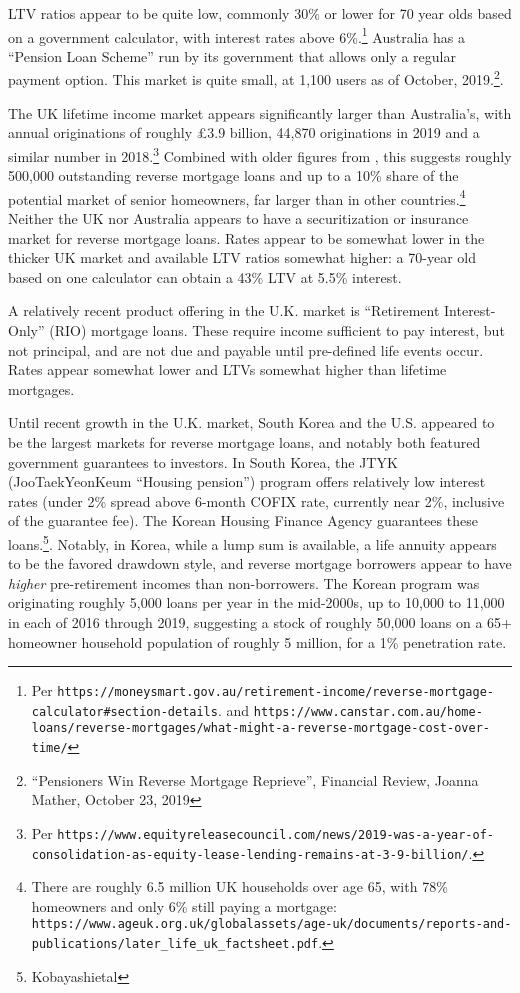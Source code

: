 \documentclass[12pt]{article}
\begin{document}
LTV ratios appear to be quite low, commonly 30\% or lower for 70 year olds
based on a government calculator, with interest rates above 6\%.\footnote{Per
\texttt{https://moneysmart.gov.au/retirement-income/reverse-mortgage-calculator\#section-details}.
and
\texttt{https://www.canstar.com.au/home-loans/reverse-mortgages/what-might-a-reverse-mortgage-cost-over-time/}}
Australia has a ``Pension Loan Scheme'' run by its government that allows only
a regular payment option. This market is quite small, at 1,100 users as of
October, 2019.\footnote{``Pensioners Win Reverse Mortgage Reprieve'', Financial
Review, Joanna Mather, October 23, 2019}.

The UK lifetime income market appears significantly larger than Australia's,
with annual originations of roughly \pounds 3.9 billion, 44,870 originations in
2019 and a similar number in 2018.\footnote{Per
\texttt{https://www.equityreleasecouncil.com/news/2019-was-a-year-of-consolidation-as-equity-lease-lending-remains-at-3-9-billion/}.}
Combined with older figures from \textcite{Kobayashietal}, this suggests
roughly 500,000 outstanding reverse mortgage loans and up to a 10\% share of
the potential market of senior homeowners, far larger than in other
countries.\footnote{There are roughly 6.5 million UK households over age 65,
with 78\% homeowners and only 6\% still paying a mortgage:
\texttt{https://www.ageuk.org.uk/globalassets/age-uk/documents/reports-and-publications/later\_life\_uk\_factsheet.pdf}.}
Neither the UK nor Australia appears to have a securitization or insurance
market for reverse mortgage loans. Rates appear to be somewhat lower in the
thicker UK market and available LTV ratios somewhat higher: a 70-year old based
on one calculator can obtain a 43\% LTV at 5.5\% interest.

A relatively recent product offering in the U.K. market is ``Retirement
Interest-Only'' (RIO) mortgage loans. These require income sufficient to pay
interest, but not principal, and are not due and payable until pre-defined life
events occur. Rates appear somewhat lower and LTVs somewhat higher than
lifetime mortgages.

Until recent growth in the U.K. market, South Korea and the U.S. appeared to be
the largest markets for reverse mortgage loans, and notably both featured
government guarantees to investors. In South Korea, the JTYK (JooTaekYeonKeum
``Housing pension'') program offers relatively low interest rates (under 2\%
spread above 6-month COFIX rate, currently near 2\%, inclusive of the guarantee
fee). The Korean Housing Finance Agency guarantees these
loans.\footnote{Kobayashietal}. Notably, in Korea, while a lump sum is
available, a life annuity appears to be the favored drawdown style, and reverse
mortgage borrowers appear to have \emph{higher} pre-retirement incomes than
non-borrowers. The Korean program was originating roughly 5,000 loans per year
in the mid-2000s, up to 10,000 to 11,000 in each of 2016 through 2019,
suggesting a stock of roughly 50,000 loans on a 65+ homeowner household
population of roughly 5 million, for a 1\% penetration rate.
\end{document}
